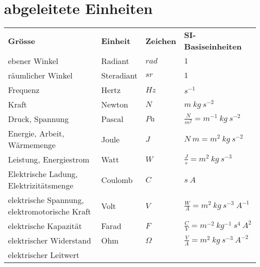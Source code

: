 \section{abgeleitete Einheiten}
\begin{footnotesize}
\begin{longtable}{p{}lll}
  \rowcolor{white}  \textbf{Grösse}
                    & \textbf{Einheit}
                    & \textbf{Zeichen}
                    & \textbf{SI-Basiseinheiten} \\
  \rowcolor{lgray}  ebener Winkel
                    & Radiant
                    & $rad$
                    & $1$ \\
  \rowcolor{white}  räumlicher Winkel
                    & Steradiant
                    & $sr$
                    & $1$ \\
  \rowcolor{lgray}  Frequenz
                    & Hertz
                    & $Hz$
                    & $s^{-1}$ \\
  \rowcolor{white}  Kraft
                    & Newton
                    & $N$
                    & $m~kg~s^{-2}$ \\
  \rowcolor{lgray}  Druck, Spannung
                    & Pascal
                    & $Pa$
                    & $\frac{N}{m^2} = m^{-1}~kg~s^{-2}$ \\
  \rowcolor{white}  Energie, Arbeit, Wärmemenge
                    & Joule
                    & $J$
                    & $N~m = m^2~kg~s^{-2}$ \\
  \rowcolor{lgray}  Leistung, Energiestrom
                    & Watt
                    & $W$
                    & $\frac{J}{s} = m^2~kg~s^{-3}$ \\
  \rowcolor{white}  Elektrische Ladung, Elektrizitätsmenge
                    & Coulomb
                    & $C$
                    & $s~A$ \\
  \rowcolor{lgray}  elektrische Spannung, elektromotorische Kraft
                    & Volt
                    & $V$
                    & $\frac{W}{A} = m^2~kg~s^{-3}~A^{-1}$ \\
  \rowcolor{white}  elektrische Kapazität
                    & Farad
                    & $F$
                    & $\frac{C}{V} = m^{-2}~kg^{-1}~s^4~A^2$ \\
  \rowcolor{lgray}  elektrischer Widerstand
                    & Ohm
                    & $\Omega$
                    & $\frac{V}{A} = m^2~kg~s^{-3}~A^{-2}$ \\
  \rowcolor{white}  elektrischer Leitwert

\end{longtable}
\end{footnotesize}
